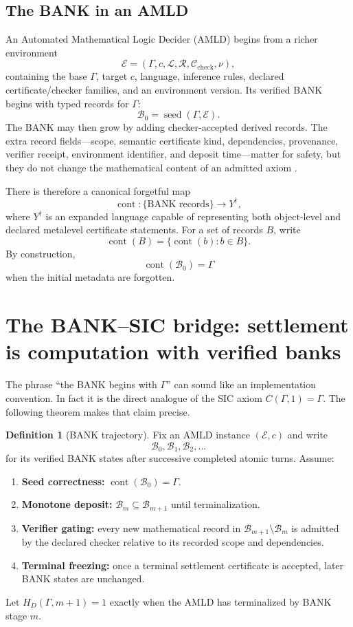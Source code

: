 \documentclass[11pt]{article}
\theoremstyle{definition}
\newtheorem{definition}[theorem]{Definition}
\theoremstyle{remark}
\newcommand{\Bank}{\mathcal B}
\newcommand{\cont}{\operatorname{cont}}
\newcommand{\seed}{\operatorname{seed}}
\begin{document}
\subsection{The BANK in an AMLD}
An Automated Mathematical Logic Decider (AMLD) begins from a richer environment
\[
\mathcal E=(\Gamma,c,\mathcal L,\mathcal R,\mathcal C_{\mathrm{check}},\nu),
\]
containing the base $\Gamma$, target $c$, language, inference rules, declared certificate/checker families, and an environment version. Its verified BANK begins with typed records for $\Gamma$:
\[
\Bank_0=\seed(\Gamma,\mathcal E).
\]
The BANK may then grow by adding checker-accepted derived records. The extra record fields---scope, semantic certificate kind, dependencies, provenance, verifier receipt, environment identifier, and deposit time---matter for safety, but they do not change the mathematical content of an admitted axiom \cite{WCTP}.

There is therefore a canonical forgetful map
\[
\cont:\{\text{BANK records}\}\to Y^\dagger,
\]
where $Y^\dagger$ is an expanded language capable of representing both object-level and declared metalevel certificate statements. For a set of records $B$, write
\[
\cont(B)=\{\cont(b):b\in B\}.
\]
By construction,
\[
\cont(\Bank_0)=\Gamma
\]
when the initial metadata are forgotten.

\section{The BANK--SIC bridge: settlement is computation with verified banks}

The phrase ``the BANK begins with $\Gamma$'' can sound like an implementation convention. In fact it is the direct analogue of the SIC axiom $C(\Gamma,1)=\Gamma$. The following theorem makes that claim precise.

\begin{definition}[BANK trajectory]
Fix an AMLD instance $(\mathcal E,c)$ and write
\[
\Bank_0,\Bank_1,\Bank_2,\ldots
\]
for its verified BANK states after successive completed atomic turns. Assume:
\begin{enumerate}[label=(B\arabic*)]
\item \textbf{Seed correctness:} $\cont(\Bank_0)=\Gamma$.
\item \textbf{Monotone deposit:} $\Bank_m\subseteq\Bank_{m+1}$ until terminalization.
\item \textbf{Verifier gating:} every new mathematical record in $\Bank_{m+1}\setminus\Bank_m$ is admitted by the declared checker relative to its recorded scope and dependencies.
\item \textbf{Terminal freezing:} once a terminal settlement certificate is accepted, later BANK states are unchanged.
\end{enumerate}
Let $H_D(\Gamma,m+1)=1$ exactly when the AMLD has terminalized by BANK stage $m$.
\end{definition}
\end{document}
